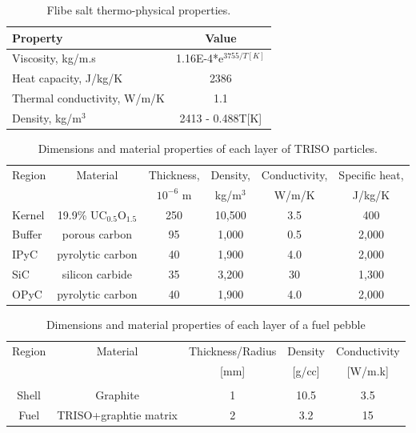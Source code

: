 \documentclass{elsarticle}
\begin{document}
\begin{table}
  \caption{Flibe salt thermo-physical properties.}
  \centering
  \begin{tabular}{lc}
    \hline
    Property & Value\\
    \hline
    Viscosity, kg/m.s & 1.16E-4*e$^{3755/T[K]}$\\
    Heat capacity, J/kg/K & 2386\\
    Thermal conductivity, W/m/K & 1.1\\
    Density, kg/m$^3$ & 2413 - 0.488T[K]\\
    \hline
  \end{tabular}
\label{tab:flibe}
\end{table}

\begin{table}
  \caption{Dimensions and material properties of each layer of TRISO particles.}
  \begin{tabular}[h]{lccccc}
    \hline
    Region&Material&Thickness,&Density,&Conductivity,&Specific heat,\\
    &&$10^{-6}$ m&kg/m$^3$&W/m/K&J/kg/K\\
    \hline
    Kernel&19.9\% UC$_{0.5}$O$_{1.5}$&250&10,500&3.5&400\\
    Buffer&porous carbon&95&1,000&0.5&2,000\\
    IPyC&pyrolytic carbon&40&1,900&4.0&2,000\\
    SiC&silicon carbide&35&3,200&30&1,300\\
    OPyC&pyrolytic carbon&40&1,900&4.0&2,000\\
    \hline
  \end{tabular}
  \label{tab:TRISO_prop}
\end{table}


\begin{table}
  \begin{tabular}[h]{ccccc}
    Region&Material&Thickness/Radius&Density&Conductivity\\
    &&[mm]&[g/cc]&[W/m.k] \\
    \hline\\
    Shell&Graphite&1&10.5&3.5\\
    Fuel&TRISO+graphtie matrix&2&3.2&15\\
  \end{tabular}
  \caption{Dimensions and material properties of each layer of a fuel pebble}
  \label{tab:pb_prop}
\end{table}
\end{document}

